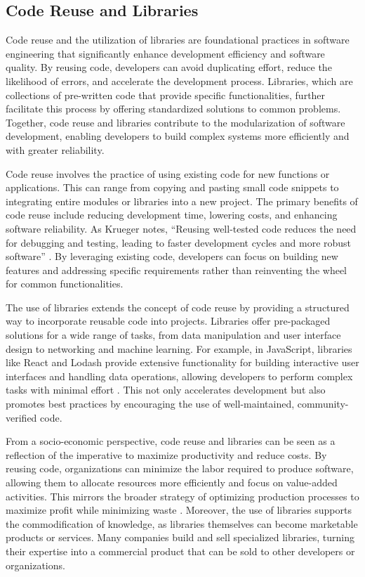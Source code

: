 \begin{refsection}
\subsection{Code Reuse and Libraries}

Code reuse and the utilization of libraries are foundational practices in software engineering that significantly enhance development efficiency and software quality. By reusing code, developers can avoid duplicating effort, reduce the likelihood of errors, and accelerate the development process. Libraries, which are collections of pre-written code that provide specific functionalities, further facilitate this process by offering standardized solutions to common problems. Together, code reuse and libraries contribute to the modularization of software development, enabling developers to build complex systems more efficiently and with greater reliability.

Code reuse involves the practice of using existing code for new functions or applications. This can range from copying and pasting small code snippets to integrating entire modules or libraries into a new project. The primary benefits of code reuse include reducing development time, lowering costs, and enhancing software reliability. As Krueger notes, “Reusing well-tested code reduces the need for debugging and testing, leading to faster development cycles and more robust software” \cite[pp.~131-133]{Krueger2004}. By leveraging existing code, developers can focus on building new features and addressing specific requirements rather than reinventing the wheel for common functionalities.

The use of libraries extends the concept of code reuse by providing a structured way to incorporate reusable code into projects. Libraries offer pre-packaged solutions for a wide range of tasks, from data manipulation and user interface design to networking and machine learning. For example, in JavaScript, libraries like React and Lodash provide extensive functionality for building interactive user interfaces and handling data operations, allowing developers to perform complex tasks with minimal effort \cite[pp.~78-81]{Pressman2019}. This not only accelerates development but also promotes best practices by encouraging the use of well-maintained, community-verified code.

From a socio-economic perspective, code reuse and libraries can be seen as a reflection of the imperative to maximize productivity and reduce costs. By reusing code, organizations can minimize the labor required to produce software, allowing them to allocate resources more efficiently and focus on value-added activities. This mirrors the broader strategy of optimizing production processes to maximize profit while minimizing waste \cite[pp.~304-306]{Sommerville2016}. Moreover, the use of libraries supports the commodification of knowledge, as libraries themselves can become marketable products or services. Many companies build and sell specialized libraries, turning their expertise into a commercial product that can be sold to other developers or organizations.


\end{refsection}

